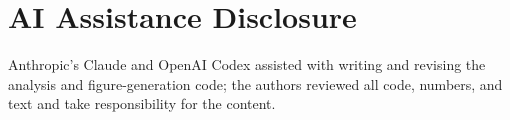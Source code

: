 \documentclass[sigconf,anonymous]{acmart}
\begin{document}
\section*{AI Assistance Disclosure}
Anthropic's Claude and OpenAI Codex assisted with writing and revising the analysis and figure-generation code; the authors reviewed all code, numbers, and text and take responsibility for the content.



\end{document}
